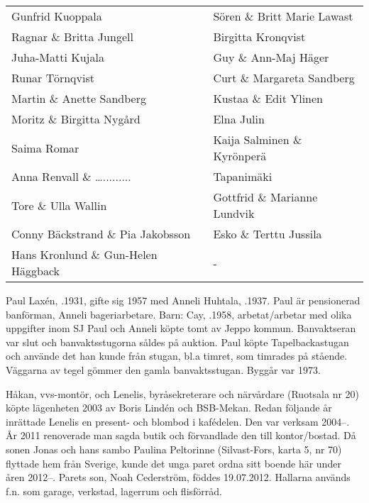 \begin{center}
\begin{tabular}{l l}
    Gunfrid Kuoppala & Sören \& Britt Marie Lawast \\
    Ragnar \& Britta Jungell & Birgitta Kronqvist \\
    Juha-Matti Kujala & Guy \& Ann-Maj Häger \\
    Runar Törnqvist & Curt \& Margareta Sandberg \\
    Martin \& Anette Sandberg & Kustaa \& Edit Ylinen \\
    Moritz \& Birgitta Nygård & Elna Julin \\
    Saima Romar & Kaija Salminen \& Kyrönperä \\
    Anna Renvall \& …......... & Tapanimäki \\
    Tore \& Ulla Wallin & Gottfrid \& Marianne Lundvik \\
    Conny Bäckstrand \& Pia Jakobsson & Esko \& Terttu Jussila \\
    Hans Kronlund \& Gun-Helen Häggback & - \\
    \hline
  \end{tabular}
\end{center}




Paul Laxén, .1931, gifte sig 1957 med Anneli Huhtala, .1937. Paul är pensionerad banförman, Anneli bageriarbetare.
Barn: Cay, .1958, arbetat/arbetar med olika uppgifter inom SJ
Paul och Anneli köpte tomt av Jeppo kommun. Banvaktseran var slut och banvaktsstugorna såldes på auktion. Paul köpte Tapelbackastugan och använde det han kunde från stugan, bl.a timret, som timrades på stående. Väggarna av tegel gömmer den gamla banvaktsstugan. Byggår var 1973.




Håkan, vvs-montör, och Lenelis, byråsekreterare och närvårdare (Ruotsala nr 20) köpte lägenheten 2003 av Boris Lindén och BSB-Mekan. Redan följande år inrättade Lenelis en present- och blombod 	i kafédelen. Den var verksam 2004--. År 2011 renoverade man sagda butik och förvandlade den till	kontor/bostad. Då sonen Jonas och hans sambo Paulina Peltorinne	(Silvast-Fors, karta 5, nr 70) flyttade hem från Sverige, kunde det unga paret ordna sitt boende här under åren 2012--. Parets son, Noah Cederström, föddes 19.07.2012.
Hallarna används f.n. som garage, verkstad, lagerrum och flisförråd.



